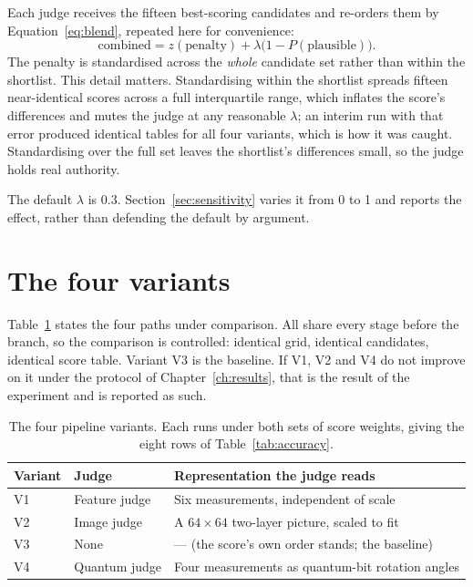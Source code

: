 Each judge receives the fifteen best-scoring candidates and re-orders them
by Equation~\eqref{eq:blend}, repeated here for convenience:
\[
\text{combined} = z(\text{penalty}) + \lambda\bigl(1 - P(\text{plausible})\bigr).
\]
The penalty is standardised across the \emph{whole} candidate set rather
than within the shortlist. This detail matters. Standardising within the
shortlist spreads fifteen near-identical scores across a full interquartile
range, which inflates the score's differences and mutes the judge at any
reasonable $\lambda$; an interim run with that error produced identical
tables for all four variants, which is how it was caught. Standardising
over the full set leaves the shortlist's differences small, so the judge
holds real authority.

The default $\lambda$ is 0.3. Section~\ref{sec:sensitivity} varies it from
0 to 1 and reports the effect, rather than defending the default by
argument.

\section{The four variants}

Table~\ref{tab:variants} states the four paths under comparison. All share
every stage before the branch, so the comparison is controlled: identical
grid, identical candidates, identical score table. Variant V3 is the
baseline. If V1, V2 and V4 do not improve on it under the protocol of
Chapter~\ref{ch:results}, that is the result of the experiment and is
reported as such.

\begin{table}[H]
\centering
\caption[The four pipeline variants]{The four pipeline variants. Each runs
under both sets of score weights, giving the eight rows of
Table~\ref{tab:accuracy}.}
\label{tab:variants}
\small
\begin{tabularx}{\textwidth}{llX}
\toprule
Variant & Judge & Representation the judge reads \\
\midrule
V1 & Feature judge & Six measurements, independent of scale \\
V2 & Image judge & A $64\times64$ two-layer picture, scaled to fit \\
V3 & None & --- (the score's own order stands; the baseline) \\
V4 & Quantum judge & Four measurements as quantum-bit rotation angles \\
\bottomrule
\end{tabularx}
\end{table}
